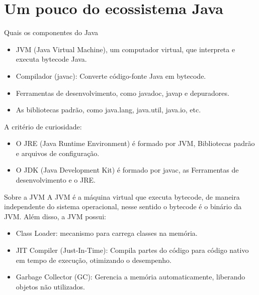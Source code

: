 \section{Um pouco do ecossistema Java}

\begin{frame}{Quais os componentes do Java}
  \begin{itemize}
    \item JVM (Java Virtual Machine), um computador virtual, que interpreta e executa bytecode Java.
    \item Compilador (javac): Converte código-fonte Java em bytecode.
    \item Ferramentas de desenvolvimento, como javadoc, javap e depuradores.
    \item As bibliotecas padrão, como java.lang, java.util, java.io, etc.
  \end{itemize}
  \pause 
  A critério de curiosidade:
  \begin{itemize}
    \item O JRE  (Java Runtime Environment) é formado por JVM, Bibliotecas padrão e arquivos de configuração.
    \item O JDK  (Java Development Kit) é formado por javac, as Ferramentas de desenvolvimento e o JRE.
  \end{itemize}
\end{frame}

\begin{frame}{Sobre a JVM}
  A JVM é a máquina virtual que executa bytecode, de maneira independente do sistema operacional, nesse sentido o bytecode é o binário da JVM. Além disso, a JVM possui:
  \begin{itemize}
    \item Class Loader: mecanismo para carrega classes na memória.
    \item JIT Compiler (Just-In-Time): Compila partes do código para código nativo em tempo de execução, otimizando o desempenho.
    \item Garbage Collector (GC):  Gerencia a memória automaticamente, liberando objetos não utilizados.
  \end{itemize}
\end{frame}

